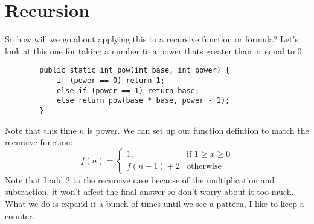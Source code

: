 \documentclass[11pt]{book}
\begin{document}
	\section{Recursion}
		So how will we go about applying this to a recursive function or formula? Let's look
		at this one for taking a number to a power thats greater than or equal to 0:

		\begin{verbatim}
		public static int pow(int base, int power) {
		    if (power == 0) return 1;
		    else if (power == 1) return base;
		    else return pow(base * base, power - 1);
		}
		\end{verbatim}

		\noindent Note that this time $n$ is power. We can set up our function defintion to match
		the recursive function:
		\[
			f(n) = 
			\begin{cases}
				1, & \text{if } 1 \geq x \geq 0 \\
				f(n - 1) + 2 & \text{otherwise}
			\end{cases}
		\]
		Note that I add 2 to the recursive case because of the multiplication and subtraction,
		it won't affect the final answer so don't worry about it too much. What we do is expand
		it a bunch of times until we see a pattern, I like to keep a counter.
\end{document}
